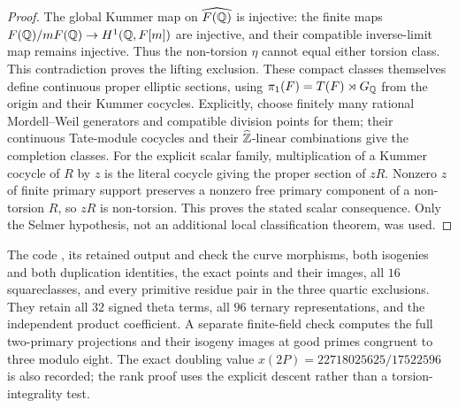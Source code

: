 \begin{proof}
The global Kummer map on \(\widehat{F(\mathbb Q)}\) is injective:
the finite maps \(F(\mathbb Q)/mF(\mathbb Q)\to H^1(\mathbb Q,F[m])\) are injective,
and their compatible inverse-limit map remains injective.
Thus the non-torsion \(\eta\) cannot equal either torsion class.
This contradiction proves the lifting exclusion.
These compact classes themselves define continuous proper
elliptic sections, using
\(\pi_1(F)=T(F)\rtimes G_\mathbb Q\) from the origin and their Kummer
cocycles.  Explicitly, choose finitely many rational
Mordell--Weil generators and compatible division points for them;
their continuous Tate-module cocycles and their
\(\widehat{\mathbb Z}\)-linear combinations give the completion classes.
For the explicit scalar family, multiplication of a
Kummer cocycle of \(R\) by \(z\) is the literal cocycle giving
the proper section of \(zR\).
Nonzero \(z\) of finite primary support preserves a nonzero
free primary component of a non-torsion \(R\), so \(zR\) is
non-torsion.  This proves the stated scalar consequence.
Only the Selmer hypothesis, not an additional local
classification theorem, was used.
\end{proof}

The code ,
its retained output and 
check the curve morphisms, both isogenies and both duplication
identities, the exact points and their images, all \(16\)
squareclasses, and every primitive residue pair in the three
quartic exclusions.  They retain all \(32\) signed theta terms,
all \(96\) ternary representations, and the independent product
coefficient.  A separate finite-field check computes the full
two-primary projections and their isogeny images at good primes
congruent to three modulo eight.
The exact doubling value
\(x(2P)=22718025625/17522596\) is also recorded; the rank proof
uses the explicit descent rather than a torsion-integrality test.
